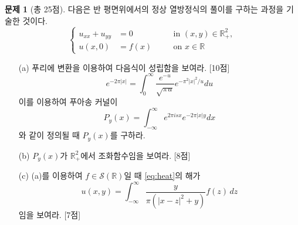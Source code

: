 \documentclass[b4paper,twocolumn]{oblivoir}
\theoremstyle{definition}
\newtheorem{problem}{문제}
\newcommand{\myd}[1]{\,d{#1}}
\begin{document}
\begin{problem}[총 25점]
다음은 반 평면위에서의 정상 열방정식의 풀이를 구하는 과정을 기술한 것이다.
\begin{equation}\label{eq:heat}
    \left\{\begin{alignedat}{2}
        u_{xx}+u_{yy}&=0&&\quad \text{in } (x,y) \in \mathbb{R}^2_+,\\
        u(x,0)&=f(x)&&\quad \text{on } x\in \mathbb{R}
    \end{alignedat}\right.
\end{equation}
\begin{enumerate} 
    \item[(a)] 푸리에 변환을 이용하여 다음식이 성립함을 보여라. [10점]
        \[ e^{-2\pi|x|}=\int_0^\infty \frac{e^{-u}}{\sqrt{\pi u}} e^{-\pi^2 |x|^2/u} du \]
        이를 이용하여 푸아송 커널이 
        \[    P_y(x)=\int_{-\infty}^{\infty} e^{2\pi i sx} e^{-2\pi |x|y} dx  \]
        와 같이 정의될 때  $P_y(x)$를 구하라.
        \newpage 
    \item[(b)] $P_y(x)$가 $\mathbb{R}^2_+$에서 조화함수임을 보여라. [8점] \textheight
    \item[(c)] (a)를 이용하여 $f\in \mathcal{S}(\mathbb{R})$일 때 \eqref{eq:heat}의 해가
        \[ u(x,y)=\int_{-\infty}^{\infty} \frac{y}{\pi (|x-z|^2+y)} f(z)\myd{z}  \]
        임을 보여라.  [7점]
\end{enumerate}
\end{problem}
\end{document}
